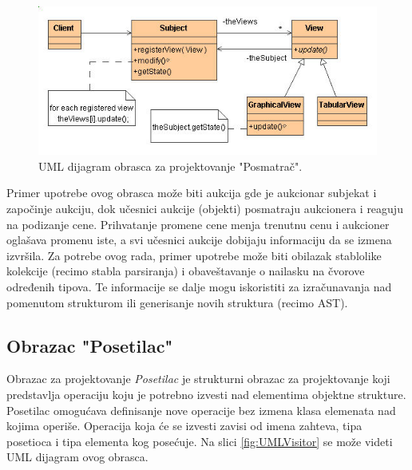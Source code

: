 \begin{figure}[h!]
\centering
\includegraphics[scale=0.7]{images/observer.jpg}
\caption{UML dijagram obrasca za projektovanje "Posmatrač".} 
\label{fig:UMLObserver}
\end{figure}

Primer upotrebe ovog obrasca može biti aukcija gde je aukcionar subjekat i započinje aukciju, dok učesnici aukcije (objekti) posmatraju aukcionera i reaguju na podizanje cene. Prihvatanje promene cene menja trenutnu cenu i aukcioner oglašava promenu iste, a svi učesnici aukcije dobijaju informaciju da se izmena izvršila. Za potrebe ovog rada, primer upotrebe može biti obilazak stablolike kolekcije (recimo stabla parsiranja) i obaveštavanje o nailasku na čvorove određenih tipova. Te informacije se dalje mogu iskoristiti za izračunavanja nad pomenutom strukturom ili generisanje novih struktura (recimo AST). 

\subsection{Obrazac "Posetilac"}
\label{subsec:DesignPatternsListener}

Obrazac za projektovanje \emph{Posetilac} je strukturni obrazac za projektovanje koji predstavlja operaciju koju je potrebno izvesti nad elementima objektne strukture. Posetilac omogućava definisanje nove operacije bez izmena klasa elemenata nad kojima operiše. Operacija koja će se izvesti zavisi od imena zahteva, tipa posetioca i tipa elementa kog posećuje. Na slici \ref{fig:UMLVisitor} se može videti UML dijagram \cite{UML} ovog obrasca. 

